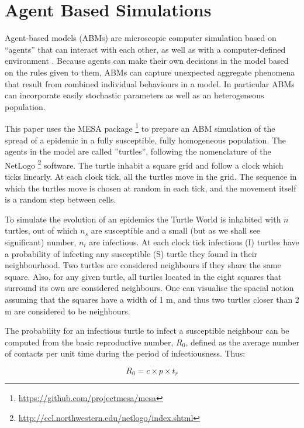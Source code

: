 \documentclass[a4paper,oneside,11pt]{article}
\begin{document}
\section{Agent Based Simulations}
\label{sec:ABM}

Agent-based models (ABMs) are microscopic computer simulation based on ``agents'' that can interact with each other, as well as with a computer-defined environment \cite{Hunter2017}. Because agents can make their own decisions in the model based on the rules given to them, ABMs can capture unexpected aggregate phenomena that result from combined individual behaviours in a model. In particular ABMs can incorporate easily stochastic parameters as well as an heterogeneous population.

This paper uses the MESA package \footnote{\url{https://github.com/projectmesa/mesa}} to prepare an ABM simulation of the spread of a epidemic in a fully susceptible, fully homogeneous population. The agents in the model are called ''turtles'', following the nomenclature of the NetLogo \footnote{\url{http://ccl.northwestern.edu/netlogo/index.shtml}} software. The turtle inhabit a square grid and follow a clock which ticks linearly. At each clock tick, all the turtles move in the grid. The sequence in which the turtles move is chosen at random in each tick, and the movement itself is a random step between cells. 

To simulate the evolution of an epidemics the Turtle World is inhabited with $n$ turtles, out of which $n_s$ are susceptible and a small (but as we shall see significant) number, $n_i$ are infectious. At each clock tick infectious (I) turtles have a probability of infecting any susceptible (S) turtle they found in their neighbourhood. Two turtles are considered neighbours if they share the same square. Also, for any given turtle, all turtles located in the eight squares that surround its own are considered neighbours. One can visualise the spacial notion assuming that the squares have a width of 1 m, and thus two turtles closer than 2 m are considered to be neighbours.

The probability for an infectious turtle to infect a susceptible neighbour can be computed from the basic reproductive number, $R_0$, defined as the average number of contacts per unit time during the period of infectiousness. Thus:

\begin{equation}
R_0 = c \times p \times t_r
\end{equation}
\end{document}
